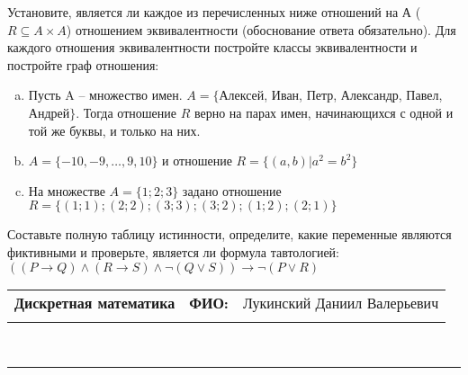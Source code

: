\documentclass[10pt]{exam}
\newcommand{\class}{Дискретная математика}
\newcommand{\examdate}{}
\begin{document}
\begin{questions}
\question
Установите, является ли каждое из перечисленных ниже отношений на А ($R \subseteq A \times A$) отношением эквивалентности (обоснование ответа обязательно). Для каждого отношения эквивалентности постройте классы 
эквивалентности и постройте граф отношения:
\begin{enumerate} [a)]\setcounter{enumi}{0}
\item Пусть A – множество имен. $A = \{ $Алексей, Иван, Петр, Александр, Павел, Андрей$ \}$. Тогда отношение $R$ верно на парах имен, начинающихся с одной и той же буквы, и только на них.
\item $A = \{-10, -9, … , 9, 10\}$ и отношение $ R = \{(a,b)|a^{2} = b^{2}\}$
\item На множестве $A = \{1; 2; 3\}$ задано отношение $R = \{(1; 1); (2; 2); (3; 3); (3; 2); (1; 2); (2; 1)\}$
\end{enumerate}\question Составьте полную таблицу истинности, определите, какие переменные являются фиктивными и проверьте, является ли формула тавтологией:
$((P \rightarrow Q) \land (R \rightarrow S) \land \neg (Q \lor S)) \rightarrow \neg (P \lor R)$

\end{questions}
\newpage
\begin{flushright}
\begin{tabular}{p{2.8in} r l}
\textbf{\class} & \textbf{ФИО:} &Лукинский Даниил Валерьевич
\\

\textbf{\examdate} &&\\
\end{tabular}\\
\end{flushright}
\rule[1ex]{\textwidth}{.1pt}
\end{document}
